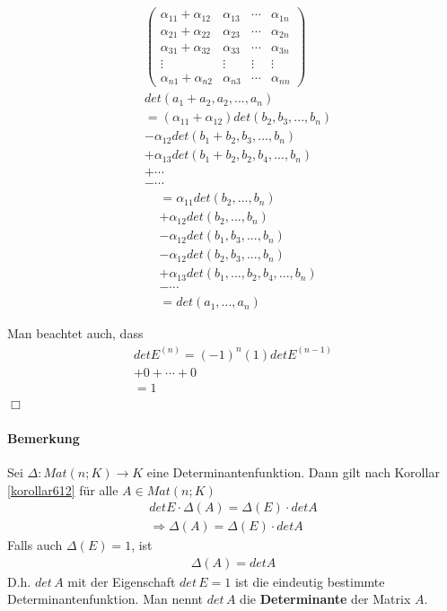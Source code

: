 \documentclass[11pt]{report}
\newcommand*\f[1] {\textbf{#1}}
\begin{document}
\begin{align}
&\begin{pmatrix} 
\alpha_{11} + \alpha_{12} & \alpha_{13} & \cdots & \alpha_{1n} \\
\alpha_{21} + \alpha_{22} & \alpha_{23} & \cdots & \alpha_{2n} \\
\alpha_{31} + \alpha_{32} & \alpha_{33} & \cdots & \alpha_{3n} \\
\vdots 	         	  & \vdots 	& \vdots & \vdots      \\
\alpha_{n1} + \alpha_{n2} & \alpha_{n3} & \cdots & \alpha_{nn}
\end{pmatrix} \\
&det(a_1 + a_2, a_2, ..., a_n) \\
&= (\alpha_{11}+\alpha_{12})det(b_2, b_3, ..., b_n)\\
&- \alpha_{12} det(b_1 + b_2, b_3, ..., b_n) \\
&+ \alpha_{13} det(b_1 + b_2, b_2, b_4, ..., b_n) \\
&+ \cdots \\
&- \cdots
\end{align}
\begin{align}
&= \alpha_{11} det(b_2, ..., b_n) \\
&+ \alpha_{12} det(b_2, ..., b_n) \\
&- \alpha_{12} det(b_1, b_3, ..., b_n) \\
&- \alpha_{12} det (b_2, b_3, ..., b_n) \\
&+ \alpha_{13} det (b_1, ..., b_2, b_4, ..., b_n) \\
&- \cdots \\
&= det(a_1, ..., a_n)
\end{align}

Man beachtet auch, dass 
\begin{align}
det E^{(n)} = (-1)^{n}(1) det E^{(n-1)} \\
+ 0 + \cdots + 0 \\
= 1 
\end{align}
\hspace*{1cm} \hfill $\Box$

\paragraph{Bemerkung}
Sei $\Delta: Mat(n;K) \rightarrow K$ eine Determinantenfunktion.
Dann gilt nach Korollar \ref{korollar612} für alle $A \in Mat(n;K)$
\begin{align}
det E \cdot \Delta(A) = \Delta(E) \cdot det A \\
\Rightarrow \Delta(A) = \Delta(E) \cdot det A
\end{align}
Falls auch $\Delta(E) = 1$, ist
\begin{align}
\Delta(A) = det A
\end{align}
D.h. $det\,A$ mit der Eigenschaft $det\,E = 1$ ist die eindeutig bestimmte Determinantenfunktion. Man nennt $det\,A$ die  \f{Determinante} der Matrix $A$.
\end{document}
